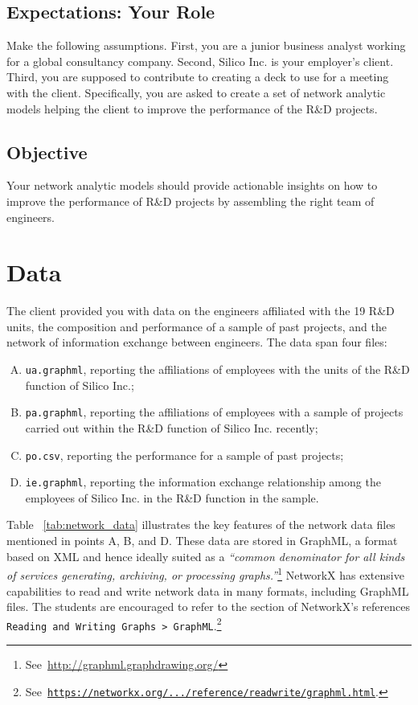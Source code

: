 \documentclass[11pt]{article}
\begin{document}
\subsection{Expectations: Your Role}

Make the following assumptions. First, you are a junior business analyst
working for a global consultancy company. Second, Silico Inc. is your employer's 
client. Third, you are supposed to contribute to
creating a deck to use for a meeting with the client. Specifically,  you are
asked to create a set of network analytic models helping the client to 
improve the performance of the R\&D projects. 

\subsection{Objective}

Your network analytic models should provide actionable insights on how 
to improve the performance of R\&D projects by assembling the right 
team of engineers.
\clearpage

\section{Data}
\label{sec:data}

The client provided you with data on the engineers affiliated with the 19 R\&D
units, the composition and performance of a sample of past projects, and the
network of information exchange between engineers. The data span four files:

\begin{enumerate}[A.]
	\item 
	\texttt{ua.graphml}, reporting the affiliations 
	of employees with the units of the R\&D function of Silico Inc.;
	\item
	\texttt{pa.graphml}, reporting the affiliations 
	of employees with a sample of projects carried out within
	the R\&D function of Silico Inc. recently;
	\item
	\texttt{po.csv}, reporting the performance for a sample of past projects;
	\item
	\texttt{ie.graphml}, reporting the information exchange 
	relationship among the employees of Silico Inc. in the R\&D function
	in the sample.
\end{enumerate}

Table ~\ref{tab:network_data} illustrates the key features of the network data
files mentioned in points A, B, and D. These data are stored in GraphML, a
format based on XML and hence ideally suited as a \textit{``common denominator
for all kinds of services generating, archiving, or processing
graphs.''}\footnote{ See~\url{http://graphml.graphdrawing.org/}} NetworkX has
extensive capabilities to read and write network data in many formats, including
GraphML files. The students are encouraged to refer to the section of NetworkX's
references \texttt{Reading and Writing Graphs > 
GraphML}.\footnote{See~\href{https://networkx.org/documentation/stable/reference/readwrite/graphml.html}
{\texttt{https://networkx.org/.../reference/readwrite/graphml.html}}.}
\end{document}
